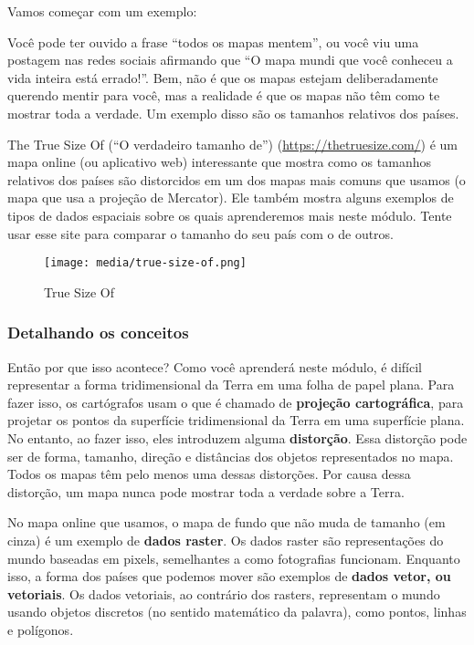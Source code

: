 \documentclass[
]{book}
\theoremstyle{definition}
\theoremstyle{definition}
\theoremstyle{definition}
\theoremstyle{definition}
\theoremstyle{remark}
\begin{document}
Vamos começar com um exemplo:

Você pode ter ouvido a frase ``todos os mapas mentem'', ou você viu uma postagem nas redes sociais afirmando que ``O mapa mundi que você conheceu a vida inteira está errado!''. Bem, não é que os mapas estejam deliberadamente querendo mentir para você, mas a realidade é que os mapas não têm como te mostrar toda a verdade. Um exemplo disso são os tamanhos relativos dos países.

The True Size Of (``O verdadeiro tamanho de'') (\url{https://thetruesize.com/}) é um mapa online (ou aplicativo web) interessante que mostra como os tamanhos relativos dos países são distorcidos em um dos mapas mais comuns que usamos (o mapa que usa a projeção de Mercator). Ele também mostra alguns exemplos de tipos de dados espaciais sobre os quais aprenderemos mais neste módulo. Tente usar esse site para comparar o tamanho do seu país com o de outros.

\begin{figure}
\centering
\texttt{[image: media/true-size-of.png]}
\caption{True Size Of}
\end{figure}

\hypertarget{detalhando-os-conceitos}{%
\subsubsection{Detalhando os conceitos}\label{detalhando-os-conceitos}}

Então por que isso acontece? Como você aprenderá neste módulo, é difícil representar a forma tridimensional da Terra em uma folha de papel plana. Para fazer isso, os cartógrafos usam o que é chamado de \textbf{projeção cartográfica}, para projetar os pontos da superfície tridimensional da Terra em uma superfície plana. No entanto, ao fazer isso, eles introduzem alguma \textbf{distorção}. Essa distorção pode ser de forma, tamanho, direção e distâncias dos objetos representados no mapa. Todos os mapas têm pelo menos uma dessas distorções. Por causa dessa distorção, um mapa nunca pode mostrar toda a verdade sobre a Terra.

No mapa online que usamos, o mapa de fundo que não muda de tamanho (em cinza) é um exemplo de \textbf{dados raster}. Os dados raster são representações do mundo baseadas em pixels, semelhantes a como fotografias funcionam. Enquanto isso, a forma dos países que podemos mover são exemplos de \textbf{dados vetor, ou vetoriais}. Os dados vetoriais, ao contrário dos rasters, representam o mundo usando objetos discretos (no sentido matemático da palavra), como pontos, linhas e polígonos.
\end{document}
